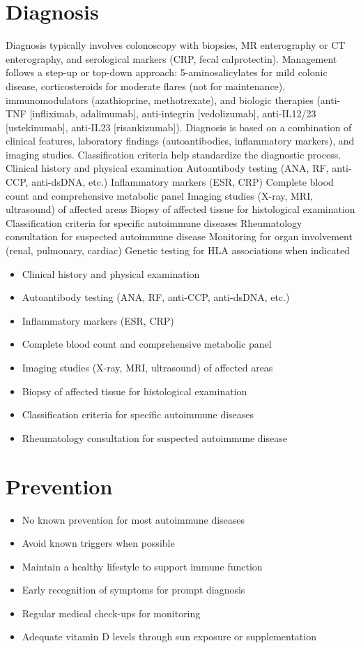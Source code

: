 \section{Diagnosis}
Diagnosis typically involves colonoscopy with biopsies, MR enterography or CT enterography, and serological markers (CRP, fecal calprotectin). Management follows a step-up or top-down approach: 5-aminosalicylates for mild colonic disease, corticosteroids for moderate flares (not for maintenance), immunomodulators (azathioprine, methotrexate), and biologic therapies (anti-TNF [infliximab, adalimumab], anti-integrin [vedolizumab], anti-IL12/23 [ustekinumab], anti-IL23 [risankizumab]). Diagnosis is based on a combination of clinical features, laboratory findings (autoantibodies, inflammatory markers), and imaging studies. Classification criteria help standardize the diagnostic process. Clinical history and physical examination Autoantibody testing (ANA, RF, anti-CCP, anti-dsDNA, etc.) Inflammatory markers (ESR, CRP) Complete blood count and comprehensive metabolic panel Imaging studies (X-ray, MRI, ultrasound) of affected areas Biopsy of affected tissue for histological examination Classification criteria for specific autoimmune diseases Rheumatology consultation for suspected autoimmune disease Monitoring for organ involvement (renal, pulmonary, cardiac) Genetic testing for HLA associations when indicated

\begin{itemize}[noitemsep]
  \item Clinical history and physical examination
  \item Autoantibody testing (ANA, RF, anti-CCP, anti-dsDNA, etc.)
  \item Inflammatory markers (ESR, CRP)
  \item Complete blood count and comprehensive metabolic panel
  \item Imaging studies (X-ray, MRI, ultrasound) of affected areas
  \item Biopsy of affected tissue for histological examination
  \item Classification criteria for specific autoimmune diseases
  \item Rheumatology consultation for suspected autoimmune disease
\end{itemize}
\section{Prevention}
\begin{itemize}[noitemsep]
  \item No known prevention for most autoimmune diseases
  \item Avoid known triggers when possible
  \item Maintain a healthy lifestyle to support immune function
  \item Early recognition of symptoms for prompt diagnosis
  \item Regular medical check-ups for monitoring
  \item Adequate vitamin D levels through sun exposure or supplementation
\end{itemize}
